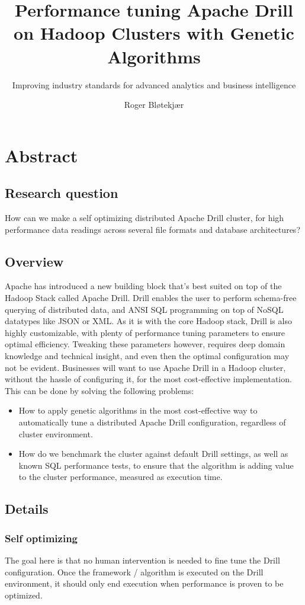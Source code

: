 \documentclass[a4paper,english]{report}
\title{Performance tuning Apache Drill on Hadoop Clusters with Genetic Algorithms}
\subtitle{Improving industry standards for advanced analytics and business intelligence}
\author{Roger Bløtekjær}
\begin{document}
	\duoforside[dept={Institutt for informatikk},
	program={Informatikk: språkteknologi},
	short]
	\section{Abstract}
		\subsection{Research question}
		How can we make a self optimizing distributed Apache Drill cluster, for high performance data readings across several file formats and database architectures?
		\subsection{Overview}
		Apache has introduced a new building block that's best suited on top of the Hadoop Stack called Apache Drill. Drill enables the user to perform schema-free querying of distributed data, and ANSI SQL programming on top of NoSQL datatypes like JSON or XML. As it is with the core Hadoop stack, Drill is also highly customizable, with plenty of performance tuning parameters to ensure optimal efficiency. Tweaking these parameters however, requires deep domain knowledge and technical insight, and even then the optimal configuration may not be evident. Businesses will want to use Apache Drill in a Hadoop cluster, without the hassle of configuring it, for the most cost-effective implementation. This can be done by solving the following problems:
		\begin{itemize}
			\item How to apply genetic algorithms in the most cost-effective way to automatically tune a distributed Apache Drill configuration, regardless of cluster environment.
			\item How do we benchmark the cluster against default Drill settings, as well as known SQL performance tests, to ensure that the algorithm is adding value to the cluster performance, measured as execution time.
		\end{itemize}
		\subsection{Details}
			\subsubsection{Self optimizing}
			The goal here is that no human intervention is needed to fine tune the Drill configuration. Once the framework / algorithm is executed on the Drill environment, it should only end execution when performance is proven to be optimized.
\end{document}

